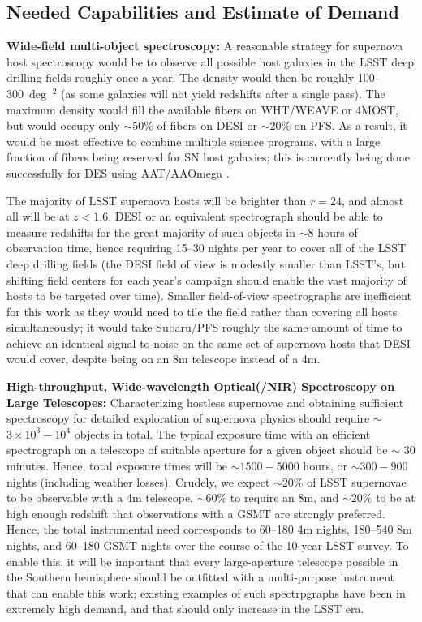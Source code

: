 \subsection{Needed Capabilities and Estimate of Demand}

{\bf Wide-field multi-object spectroscopy:}  A reasonable strategy for supernova host spectroscopy would be to observe all possible host galaxies in the LSST deep drilling fields 
roughly once a year.  The density would then be roughly
100--300~deg$^{-2}$ (as some galaxies will not yield redshifts after a
single pass).  The maximum density would fill the available fibers on WHT/WEAVE or 4MOST, but would occupy only $\sim 50\%$ of fibers on DESI or $\sim 20\%$ on PFS.    As a result, it would be most effective to combine multiple science programs, with a large fraction of fibers being reserved for SN host galaxies; this is
currently being done successfully for DES using AAT/AAOmega
\citep{Yuan15}.

The majority of LSST supernova hosts will be brighter than $r=24$, and almost all will be at $z<1.6$.  DESI or an equivalent spectrograph should be able to measure redshifts for the great majority of such objects in $\sim 8$ hours of observation time, hence requiring 15--30 nights per year to cover all of the LSST deep drilling fields (the DESI field of view is modestly smaller than LSST's, but shifting field centers for each year's campaign should enable the vast majority of hosts to be targeted over time).  Smaller field-of-view spectrographs are inefficient for this work as they would need to tile the field rather than covering all hosts simultaneously; it would take Subaru/PFS roughly the same amount of time to achieve an identical signal-to-noise on the same set of supernova hosts that DESI would cover, despite being on an 8m telescope instead of a 4m.  

{\bf High-throughput, Wide-wavelength Optical(/NIR) Spectroscopy on Large Telescopes:}  Characterizing hostless supernovae and obtaining sufficient spectroscopy for detailed exploration of supernova physics should require $\sim$ $3\times10^3 -10^4$ objects in total.  The typical exposure time with an efficient spectrograph on a telescope of suitable aperture for a given object should be $\sim$ 30 minutes.  Hence, total exposure times will be $\sim 1500-5000$ hours, or $\sim 300-900$ nights (including weather losses).  Crudely, we expect $\sim 20\%$ of LSST supernovae to be observable with a 4m telescope, $\sim 60\%$ to require an 8m, and $\sim 20\%$ to be at high enough redshift that observations with a GSMT are strongly preferred.  Hence, the total instrumental need corresponds to 60--180 4m nights, 180--540 8m nights, and 60--180 GSMT nights over the course of the 10-year LSST survey.  To enable this, it will be important that every large-aperture telescope possible in the Southern hemisphere should be outfitted with a multi-purpose instrument that can enable this work; existing examples of such spectrpgraphs have been in extremely high demand, and that should only increase in the LSST era.


